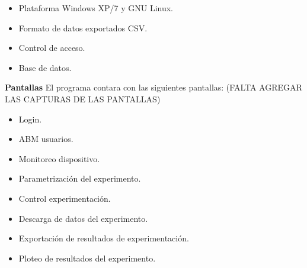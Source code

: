     \begin{itemize}
      \item Plataforma Windows XP/7 y GNU Linux.
      \item Formato de datos exportados CSV.
      \item Control de acceso.
      \item Base de datos.
    \end{itemize}
  
    \textbf{Pantallas}
      El programa contara con las siguientes pantallas: (FALTA AGREGAR LAS CAPTURAS DE LAS PANTALLAS)

    \begin{itemize}
      \item Login.      
      \item ABM usuarios.
      \item Monitoreo dispositivo.
      \item Parametrización del experimento.
      \item Control experimentación.
      \item Descarga de datos del experimento.
      \item Exportación de resultados de experimentación.
      \item Ploteo de resultados del experimento.
    \end{itemize}
  
  \newpage


 
